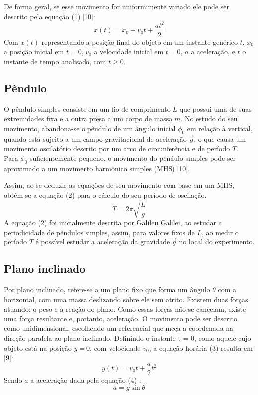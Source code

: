 \documentclass[12pt, letterpaper]{article}
\begin{document}
De forma geral, se esse movimento for uniformimente variado ele pode ser descrito pela equação (1) [10]:
\begin{equation}
 x(t) = x_{0} + v_{0}t + \frac{at^2}{2}
\end{equation}
Com $x(t)$ representando a posição final do objeto em um instante genérico $t$, $x_{0}$ a posição inicial em $t = 0$, $v_{0}$ a velocidade inicial em $t = 0$, $a$ a aceleração, e $t$ o instante de tempo analisado, com $t \geq 0$.

    \subsection{Pêndulo}
        O pêndulo simples consiste em um fio de comprimento $L$ que possui uma de suas extremidades fixa e a outra presa a um corpo de massa $m$. No estudo do seu movimento, abandona-se o pêndulo de um ângulo inicial $\phi_{0}$ em relação à vertical, quando está sujeito a um campo gravitacional de aceleração $\vec g$, o que causa um movimento oscilatório descrito por um arco de circunferência e de período $T$. Para $\phi_{0}$ suficientemente pequeno, o movimento do pêndulo simples pode ser aproximado a um movimento harmônico simples (MHS) [10]. 
        
        Assim, ao se deduzir as equações de seu movimento com base em um MHS, obtém-se a equação (2) para o cálculo do seu período de oscilação.
        \begin{equation}
            T = 2\pi \sqrt{\frac{L}{g}}
        \end{equation}
        A equação (2) foi inicialmente descrita por Galileu Galilei, ao estudar a periodicidade de pêndulos simples, assim, para valores fixos de $L$, ao medir o período $T$ é possível estudar a aceleração da gravidade $\vec g$ no local do experimento.
        
    \subsection{Plano inclinado}
       Por plano inclinado, refere-se a um plano fixo que forma um ângulo $\theta$ com a horizontal, com uma massa deslizando sobre ele sem atrito. Existem duas forças atuando: o peso e a reação do plano. Como essas forças não se cancelam, existe uma força resultante e, portanto, aceleração.      
       O movimento pode ser descrito como unidimensional, escolhendo um referencial que meça a coordenada na direção paralela ao plano inclinado. Definindo o instante t = 0, como aquele cujo objeto está na posição $y = 0$, com velocidade $v_0$, a equação horária (3) resulta em [9]:
       \begin{equation}
          y(t) = v_{0}t + \frac{a}{2}t^2
       \end{equation}
       Sendo $a$ a aceleração dada pela equação (4) :
       \begin{equation}
          a = g\sin{\theta}
       \end{equation}
       
\end{document}
